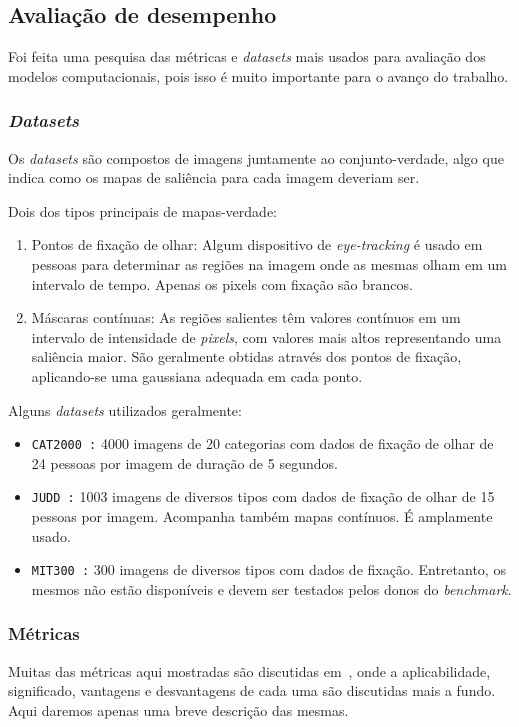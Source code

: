 \documentclass[article]{IEEEtran}
\newcommand{\tit}[1]{\textit{#1}}
\newcommand{\ttt}[1]{\texttt{#1}}
\begin{document}
\subsection{Avaliação de desempenho}
Foi feita uma pesquisa das métricas e \tit{datasets} mais usados para
avaliação dos modelos computacionais, pois isso
é muito importante para o avanço do trabalho.

\subsubsection{\tit{Datasets}}
Os \tit{datasets} são compostos de imagens juntamente ao conjunto-verdade,
algo que indica como os mapas de saliência para cada imagem deveriam ser.

Dois dos tipos principais de mapas-verdade:
\begin{enumerate}
	\item Pontos de fixação de olhar: Algum dispositivo de
	\tit{eye-tracking} é usado em pessoas para determinar as regiões na imagem
	onde as mesmas olham em um intervalo de tempo. Apenas os pixels com
	fixação são brancos.

	\item Máscaras contínuas: As regiões salientes têm valores
	contínuos em um intervalo de intensidade de \tit{pixels}, com valores
	mais altos representando uma saliência maior.
	São geralmente obtidas através dos pontos de fixação, aplicando-se
	uma gaussiana adequada em cada ponto.
\end{enumerate}

Alguns \tit{datasets} utilizados geralmente:
\begin{itemize}
	\item \ttt{CAT2000~\cite{cat2000}:} 4000 imagens de 20 categorias com
		dados de fixação de olhar de 24 pessoas por imagem de duração de
		5 segundos.

	\item \ttt{JUDD~\cite{juddBM}:} 1003 imagens de diversos tipos com
		dados de fixação de olhar de 15 pessoas por imagem. Acompanha também
		mapas contínuos. É amplamente usado.

	\item \ttt{MIT300~\cite{mit-300}:} 300 imagens de diversos tipos
		com dados de fixação. Entretanto, os mesmos não estão disponíveis
		e devem ser testados pelos donos do \tit{benchmark}.
\end{itemize}

\subsubsection{Métricas}
Muitas das métricas aqui mostradas são discutidas em~\cite{judd2},
onde a aplicabilidade, significado, vantagens e desvantagens
de cada uma são discutidas mais a fundo. Aqui daremos apenas uma breve
descrição das mesmas.
\end{document}
